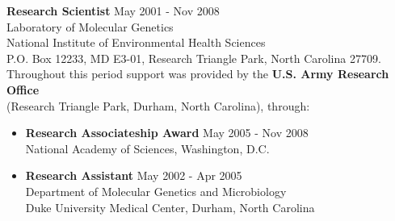 \documentclass[margin]{res} %
\begin{document}
\begin{resume}
\textbf{Research Scientist} \hfill May 2001  - Nov 2008\vspace{0.1 cm}\\
Laboratory of Molecular Genetics\\
National Institute of Environmental Health Sciences\\
P.O. Box 12233, MD E3-01, Research Triangle Park, North Carolina 27709.\vspace{0.2 cm}\\
Throughout this period support was provided by the \textbf{U.S. Army Research Office}\\
(Research Triangle Park, Durham, North Carolina), through\vspace{0.1 cm}:

\begin{itemize} \itemsep -2pt %

\iffalse
\item \textit{National Academy of Sciences} \hfill May 2005 - Nov 2008\\
Washington, D.C.
National Research Council Resident\\
Research Associateship Award 
\item ablah bblah cblah\\
\hspace{\labelwidth}\phantom{\texttt{}----}this line should start right under ``ablah'' above
\fi

\item \textbf{Research Associateship Award} \hfill May 2005 - Nov 2008\vspace{0.05 cm}\\
National Academy of Sciences, Washington, D.C.\vspace{0.1 cm}
        
\item \textbf{Research Assistant} \hfill May 2002 - Apr 2005\vspace{0.05 cm}\\
Department of Molecular Genetics and Microbiology\\
Duke University Medical Center, Durham, North Carolina\vspace{0.1 cm}


\end{itemize}
\end{resume}
\end{document}
